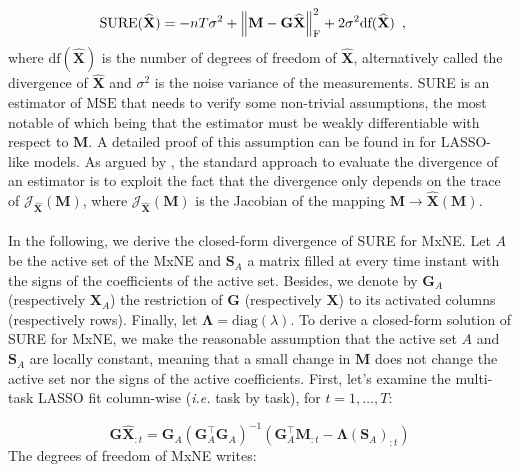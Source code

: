 \begin{align} \label{eq:7}
    \text{SURE}(\widehat{\mathbf{X}})
    &= -nT\sigma^2 + \left \lVert 
        \mathbf{M} - \mathbf{G}\widehat{\mathbf{X}}
     \right \rVert_{\text{F}}^2
    + 2 \sigma^2 \text{df}(\widehat{\mathbf{X}})
    \enspace ,
\end{align}
%
where $\text{df}(\widehat{\mathbf{X}})$ is the number of degrees of freedom of $\widehat{\mathbf{X}}$,
alternatively called the divergence of $\widehat{\mathbf{X}}$ and $\sigma^2$ is the noise variance of the measurements.
SURE is an estimator of $\text{MSE}$ that needs to verify some non-trivial assumptions,
the most notable of which being that the estimator must be weakly differentiable with respect to $\mathbf{M}$.
A detailed proof of this assumption can be found in \cite{Zou_Hastie_Tibshirani07}
for LASSO-like models. As argued by \cite{Deledalle_Vaiter_Fadili_Peyre14}, the standard approach to evaluate the divergence
of an estimator is to exploit the fact that the divergence only depends on the trace of $\mathcal{J}_{\widehat{\mathbf{X}}}(\mathbf{M})$,
where $\mathcal{J}_{\widehat{\mathbf{X}}}(\mathbf{M})$ is the Jacobian of the mapping $\mathbf{M} \rightarrow \widehat{\mathbf{X}}(\mathbf{M})$.
\\
\\
In the following, we derive the closed-form divergence of SURE for MxNE. Let $A$ be the active set
of the MxNE and $\mathbf{S}_A$ a matrix filled at every time instant with the signs of the coefficients of the active set.
Besides, we denote by $\mathbf{G}_A$ (respectively $\mathbf{X}_A$) the restriction of $\mathbf{G}$ (respectively $\mathbf{X}$) to its activated
columns (respectively rows). Finally, let $\mathbf{\Lambda} = \text{diag}(\lambda)$.
To derive a closed-form solution of SURE for MxNE, we make the reasonable assumption that the active set $A$ and $\mathbf{S}_A$ are locally constant,
meaning that a small change in $\mathbf{M}$ does not change the active set nor the signs of the active
coefficients. First, let's examine the multi-task LASSO fit column-wise (\textit{i.e.} task by task), for
$t = 1, \dots, T$:

\begin{equation*}
    \mathbf{G\widehat{X}}_{:t}
    = \mathbf{G}_A (\mathbf{G}_A^{\top}\mathbf{G}_A)^{-1}
    \left(
        \mathbf{G}^{\top}_{A}\mathbf{M}_{:t}
        -
        \mathbf{\Lambda} (\mathbf{S}_{A})_{:t}
    \right)
\end{equation*}
%
The degrees of freedom of MxNE writes:

